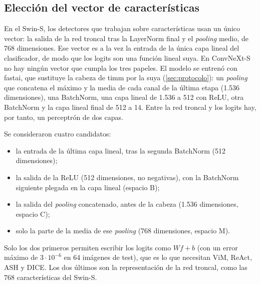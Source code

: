 


\subsection{Elección del vector de características}\label{sec:apd-espacio}

En el Swin-S, los detectores que trabajan sobre características usan un único vector: la salida
de la red troncal tras la LayerNorm final y el \emph{pooling} medio, de 768 dimensiones. Ese vector
es a la vez la entrada de la única capa lineal del clasificador, de modo que los logits son una
función lineal suya. En ConvNeXt-S no hay ningún vector que cumpla los tres papeles. El modelo se
entrenó con fastai, que sustituye la cabeza de timm por la suya
(\cref{sec:protocolo}): un \emph{pooling} que concatena el máximo y la media de cada canal de la
última etapa (1.536 dimensiones), una BatchNorm, una capa lineal de 1.536 a 512 con ReLU, otra
BatchNorm y la capa lineal final de 512 a 14. Entre la red troncal y los logits hay, por tanto, un
perceptrón de dos capas.

Se consideraron cuatro candidatos:
\begin{itemize}
  \item la entrada de la última capa lineal, tras la segunda BatchNorm (512 dimensiones);
  \item la salida de la ReLU (512 dimensiones, no negativas), con la BatchNorm siguiente plegada
        en la capa lineal (espacio B);
  \item la salida del \emph{pooling} concatenado, antes de la cabeza (1.536 dimensiones, espacio C);
  \item solo la parte de la media de ese \emph{pooling} (768 dimensiones, espacio M).
\end{itemize}
Solo los dos primeros permiten escribir los logits como $Wf + b$ (con un error máximo de
$3\cdot10^{-6}$ en 64 imágenes de test), que es lo que necesitan ViM, ReAct, ASH y DICE. Los dos
últimos son la representación de la red troncal, como las 768 características del Swin-S.

